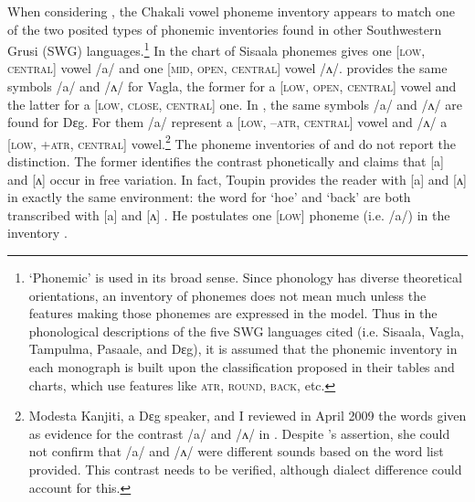 When considering  \cite{Rowl65, Crou66, Gray69,   Toup95, Crou03}, the
Chakali vowel phoneme inventory appears to match one of the two posited types 
of  phonemic
inventories found in other  Southwestern Grusi (SWG)
languages.\footnote{`Phonemic' is used in its broad sense. Since phonology has
diverse theoretical orientations,  an inventory of phonemes does not mean much
unless the features making those phonemes are expressed in the model.  Thus in 
the phonological descriptions of the five SWG languages cited 
(i.e. Sisaala, Vagla, Tampulma,  Pasaale, and  Dɛg), it is 
assumed that the phonemic inventory in each monograph is built upon the
classification proposed in their tables and charts, which use features like
\textsc{atr}, \textsc{round}, \textsc{back}, etc.} In \citet[15]{Rowl65} the
chart of Sisaala phonemes gives one [\textsc{low},
\textsc{central}]
vowel /a/ and one [\textsc{mid}, \textsc{open}, \textsc{central}]
vowel /ʌ/. \citet[17]{Crou66}
provides the same symbols /a/ and /ʌ/ for Vagla, the former for a
[\textsc{low}, \textsc{open}, \textsc{central}] vowel and the latter for
a [\textsc{low}, \textsc{close}, \textsc{central}] one. In
\citet[3]{Crou03}, the same symbols /a/ and /ʌ/ are found for
Dɛg. For them
/a/
represent a [\textsc{low}, \textsc{--atr}, \textsc{central}] vowel
and /ʌ/ a [\textsc{low}, \textsc{+atr}, \textsc{central}]
vowel.\footnote{\label{fn:info-deg}Modesta Kanjiti, a  Dɛg speaker,  and I 
reviewed  in
April 2009
the words given as evidence for the contrast /a/ and /ʌ/ in
\citet[20--21]{Crou03}. Despite  \citeauthor{Crou03}'s
assertion,   she
could not confirm that /a/ and /ʌ/ were different sounds based on the word list
provided. This contrast needs
to be verified, although dialect difference could account 
for this.}   The phoneme inventories of
\citet[16]{Toup95} and  \citet[21]{Gray69} 
do not report the distinction. The former identifies the contrast phonetically
and claims that [a]
and [ʌ] occur in free variation. In fact, Toupin provides the reader with
[a] and [ʌ] in
exactly the same environment: the word for `hoe' and `back' are both transcribed
with [a] and [ʌ]  \citep[26]{Toup95}. He postulates one [\textsc{low}] phoneme
 (i.e.  /a/) in the
inventory \citep[16]{Toup95}.



